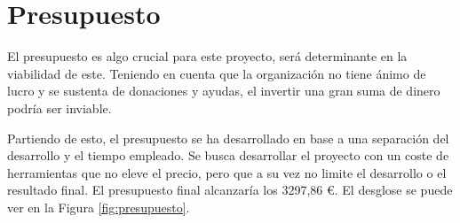 \section{Presupuesto}

El presupuesto es algo crucial para este proyecto, será determinante en la viabilidad de este. Teniendo en cuenta que la organización no tiene ánimo de lucro y se sustenta de donaciones y ayudas, el invertir una gran suma de dinero podría ser inviable.

Partiendo de esto, el presupuesto se ha desarrollado en base a una separación del desarrollo y el tiempo empleado. Se busca desarrollar el proyecto con un coste de herramientas que no eleve el precio, pero que a su vez no limite el desarrollo o el resultado final. El presupuesto final alcanzaría los 3297,86 €. El desglose se puede ver en la Figura \ref{fig:presupuesto}.

